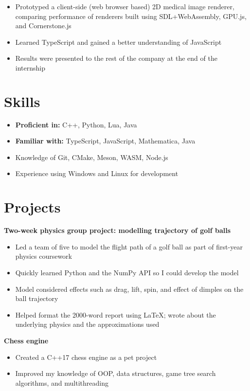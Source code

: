 \documentclass{article}
\begin{document}
		\begin{itemize}
			\item Prototyped a client-side (web browser based) 2D medical image renderer, comparing performance of renderers built using SDL+WebAssembly, GPU.js, and Cornerstone.js
			\item Learned TypeScript and gained a better understanding of JavaScript
			\item Results were presented to the rest of the company at the end of the internship
		\end{itemize}
	
	\section*{Skills}
		\begin{itemize}
			\item \textbf{Proficient in:} C++, Python, Lua, Java
			\item \textbf{Familiar with:} TypeScript, JavaScript, Mathematica, Java
			\item Knowledge of Git, CMake, Meson, WASM, Node.js
			\item Experience using Windows and Linux for development
		\end{itemize}
	
	\section*{Projects}
		\textbf{Two-week physics group project: modelling trajectory of golf balls}
		\begin{itemize}
			\item Led a team of five to model the flight path of a golf ball as part of first-year physics coursework
			\item Quickly learned Python and the NumPy API so I could develop the model
			\item Model considered effects such as drag, lift, spin, and effect of dimples on the ball trajectory
			\item Helped format the 2000-word report using LaTeX; wrote about the underlying physics and the approximations used
		\end{itemize}
		\textbf{Chess engine}
		\begin{itemize}
			\item Created a C++17 chess engine as a pet project
			\item Improved my knowledge of OOP, data structures, game tree search algorithms, and multithreading
		\end{itemize}
	
\end{document}
